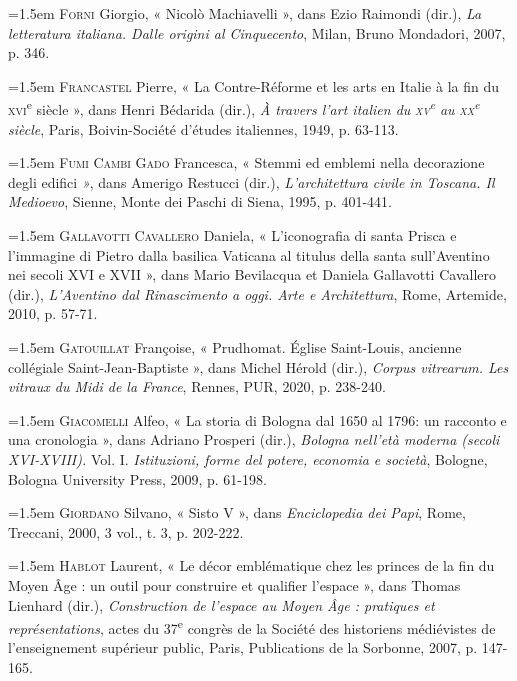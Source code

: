 \documentclass[12pt,twoside,openany]{book}
\newenvironment{PurhBibliography}
  {%
    \par
    \setlength{\parindent}{0pt}%
    \setlength{\leftskip}{0pt}%
  }
  {%
    \par
  }
\begin{document}
\begin{PurhBibliography}
\noindent\hangindent=1.5em \textsc{Forni} Giorgio, « Nicolò Machiavelli », dans Ezio Raimondi (dir.), \textit{La letteratura italiana. Dalle origini al Cinquecento}, Milan, Bruno Mondadori, 2007, p. 346.\par
\noindent\hangindent=1.5em \textsc{Francastel} Pierre, « La Contre-Réforme et les arts en Italie à la fin du \textsc{xvi}\textsuperscript{e} siècle », dans Henri Bédarida (dir.), \textit{À travers l’art italien du }\textit{\textsc{xv}}\textit{\textsuperscript{e }}\textit{au }\textit{\textsc{xx}}\textit{\textsuperscript{e}}\textit{ siècle}, Paris, Boivin-Société d’études italiennes, 1949, p. 63-113.\par
\noindent\hangindent=1.5em \textsc{Fumi Cambi Gado} Francesca, « Stemmi ed emblemi nella decorazione degli edifici\textit{ »}, dans Amerigo Restucci (dir.),\textit{ L’architettura civile in Toscana. Il Medioevo}, Sienne, Monte dei Paschi di Siena, 1995, p. 401-441.\par
\noindent\hangindent=1.5em \textsc{Gallavotti Cavallero} Daniela, « L’iconografia di santa Prisca e l’immagine di Pietro dalla basilica Vaticana al titulus della santa sull’Aventino nei secoli \textsc{XVI} e \textsc{XVII} », dans Mario Bevilacqua et Daniela Gallavotti Cavallero (dir.), \textit{L’Aventino dal Rinascimento a oggi. Arte e Architettura}, Rome, Artemide, 2010, p. 57-71.\par
\noindent\hangindent=1.5em \textsc{Gatouillat} Françoise, « Prudhomat. Église Saint-Louis, ancienne collégiale Saint-Jean-Baptiste », dans Michel Hérold (dir.), \textit{Corpus vitrearum. Les vitraux du Midi de la France}, Rennes, PUR, 2020, p. 238-240.\par
\noindent\hangindent=1.5em \textsc{Giacomelli} Alfeo, « La storia di Bologna dal 1650 al 1796: un racconto e una cronologia », dans Adriano Prosperi (dir.), \textit{Bologna nell’età moderna (secoli XVI-XVIII). }Vol. I.\textit{ Istituzioni, forme del potere, economia e società}, Bologne, Bologna University Press, 2009, p. 61-198.\par
\noindent\hangindent=1.5em \textsc{Giordano} Silvano, « Sisto V », dans \textit{Enciclopedia dei Papi}, Rome, Treccani, 2000, 3 vol., t. 3, p. 202-222.\par
\noindent\hangindent=1.5em \textsc{Hablot} Laurent, « Le décor emblématique chez les princes de la fin du Moyen Âge : un outil pour construire et qualifier l’espace », dans Thomas Lienhard (dir.), \textit{Construction de l’espace au Moyen Âge : pratiques et représentations}, actes du 37\textsuperscript{e} congrès de la Société des historiens médiévistes de l’enseignement supérieur public, Paris, Publications de la Sorbonne, 2007, p. 147-165.\par

\end{PurhBibliography}
\end{document}
